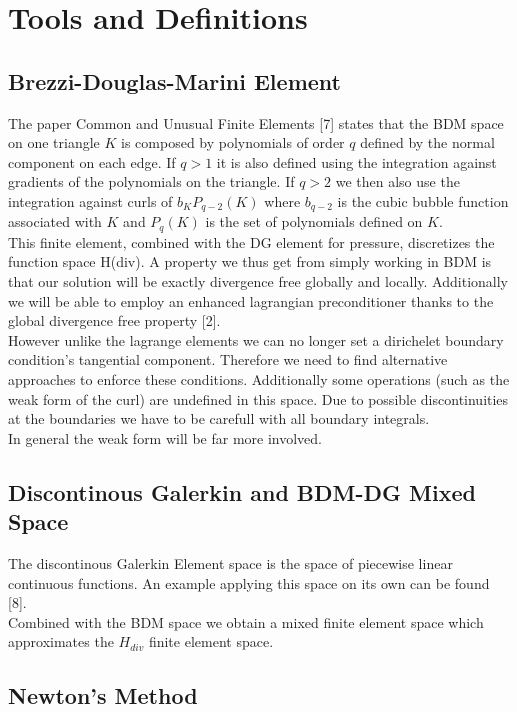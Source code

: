 \documentclass[11pt,twoside,a4paper]{article}
\begin{document}
\section{Tools and Definitions}
\subsection{Brezzi-Douglas-Marini Element}
The paper Common and Unusual Finite Elements [7] states that the BDM space on one triangle $K$ is composed by polynomials of order $q$ defined by the normal component on each edge. If $q > 1$ it is also defined using the integration against gradients of the polynomials on the triangle. If $q > 2$ we then also use the integration  against curls of $b_K P_{q-2}(K)$ where $b_{q-2}$ is the  cubic bubble function associated with $K$ and $P_{q}(K)$ is the set of polynomials defined on $K$.\\
This finite element, combined with the DG element for pressure, discretizes the function space H(div). A property we thus get from simply working in BDM is that our solution will be exactly divergence free globally and locally.
Additionally we will be able to employ an enhanced lagrangian preconditioner thanks to the global divergence free property [2].\\

However unlike the lagrange elements we can no longer set a dirichelet boundary condition's tangential component. Therefore we need to find alternative approaches to enforce these conditions.
Additionally some operations (such as the weak form of the curl) are undefined in this space. Due to possible discontinuities at the boundaries we have to be carefull with all boundary integrals.\\

In general the weak form will be far more involved.


\subsection{Discontinous Galerkin and BDM-DG Mixed Space}
The discontinous Galerkin Element space is the space of piecewise linear continuous functions. An example applying this space on its own can be found [8].\\
Combined with the BDM space we obtain a mixed finite element space which approximates the $H_{div}$ finite element space.\\

\subsection{Newton's Method}
\end{document}
